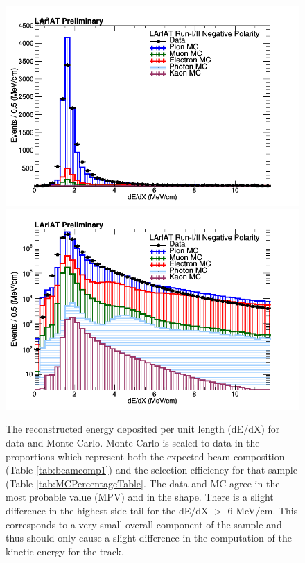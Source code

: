 \begin{figure}[h!]
\centering
\includegraphics[scale=0.33]{./images/dEdX.png}
\includegraphics[scale=0.33]{./images/dEdXLog.png}
\caption{The reconstructed energy deposited per unit length (dE/dX) for data and Monte Carlo. Monte Carlo is scaled to data in the proportions which represent both the expected beam composition (Table \ref{tab:beamcomp1}) and the selection efficiency for that sample (Table \ref{tab:MCPercentageTable}. The data and MC agree in the most probable value (MPV) and in the shape. There is a slight difference in the highest side tail for the dE/dX $>$ 6 MeV/cm. This corresponds to a very small overall component of the sample and thus should only cause a slight difference in the computation of the kinetic energy for the track.}
\label{fig:DataMCdEdX}
\end{figure}

